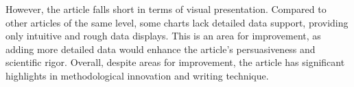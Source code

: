 \documentclass[9pt,a4paper,twocolumn,twoside]{tau-class/tau}
\begin{document}
However, the article falls short in terms of visual presentation. Compared to other articles of the same level, some charts lack detailed data support, providing only intuitive and rough data displays. This is an area for improvement, as adding more detailed data would enhance the article's persuasiveness and scientific rigor. Overall, despite areas for improvement, the article has significant highlights in methodological innovation and writing technique.

%
\end{document}
